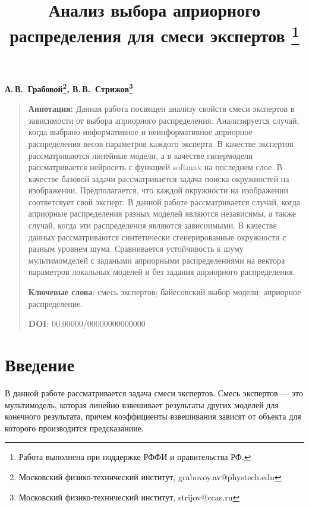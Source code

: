\documentclass[12pt, twoside]{article}
\numberwithin{equation}{section}
\begin{document}
\title{\bf Анализ выбора априорного распределения для смеси экспертов \thanks{Работа выполнена при поддержке РФФИ и правительства РФ.}}
\date{}
\author{}
\maketitle

\begin{center}
\bf
А.\,В.~Грабовой\footnote{Московский физико-технический институт, grabovoy.av@phystech.edu}, В.\,В.~Стрижов\footnote{Московский физико-технический институт, strijov@ccas.ru}

\end{center}

{\centering\begin{quote}
\textbf{Аннотация:} 
Данная работа посвящен анализу свойств смеси экспертов в зависимости от выбора априорного распределения. Анализируется случай, когда выбрано информативное и неинформативное априорное распределения весов параметров каждого эксперта. В качестве экспертов рассматриваются линейные модели, а в качестве гипермодели рассматривается нейросеть с функцией softmax на последнем слое. В качестве базовой задачи рассматривается задача поиска окружностей на изображении. Предполагается, что каждой окружности на изображении соответсвует свой эксперт. В данной работе рассматривается случай, когда априорные распределения разных моделей являются независимы, а также случай, когда эти распределения являются зависиимыми. В качестве данных рассматриваются синтетически сгенерированные окружности с разным уровнем шума. Сравнивается устойчивость к шуму мультимомделей с задаными априорными распределениями на вектора параметров локальных моделей и без задания априорного распределения.

\smallskip
\textbf{Ключевые слова}: смесь экспертов; байесовский выбор модели; априорное распределение.

\smallskip
\textbf{DOI}: 00.00000/00000000000000
\end{quote}
}

\section{Введение}
В данной работе рассматривается задача смеси экспертов. Смесь экспертов --- это мультимодель, которая линейно взвешивает результаты других моделей для конечного результата, причем коэффициенты взвешивания зависят от объекта для которого производится предсказаниие.
\end{document}
